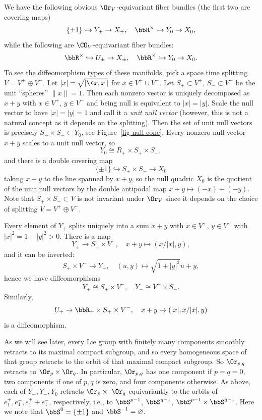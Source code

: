 We have the following obvious $\Or_V$-equivariant fiber bundles (the first two are covering maps)
\[\{\pm 1\}\hookrightarrow Y_\pm\to X_\pm,\quad \bbR^\times\hookrightarrow Y_0\to X_0,\]
while the following are $\CO_V$-equivariant fiber bundles:
\[\bbR^\times\hookrightarrow U_\pm\to X_\pm,\quad \bbR^\times\hookrightarrow Y_0\to X_0.\]
To see the diffeomorphism types of these manifolds, pick a space time splitting $V=V^+\oplus V^-$. Let $|x|=\sqrt{|\<x,x\>|}$ for $x\in V^+\cup V^-$. Let $S_+\subset V^+$, $S_-\subset V^-$ be the unit ``spheres'' $\lVert x\rVert =1$. Then each nonzero vector is uniquely decomposed as $x+y$ with $x\in V^+$, $y\in V^-$ and being null is equivalent to $|x|=|y|$. Scale the null vector to have $|x|=|y|=1$ and call it a \emph{unit null vector} (however, this is not a natural concept as it depends on the splitting). Then the set of unit null vectors is precisely $S_+\times S_-\subset Y_0$, see Figure~\ref{fig null cone}. Every nonzero null vector $x+y$ scales to a unit null vector, so 
\[Y_0\cong R_+\times S_+\times S_-,\]
and there is a double covering map 
\[\{\pm 1\}\hookrightarrow S_+\times S_-\to X_0\]
taking $x+y$ to the line spanned by $x+y$, so the null quadric $X_0$ is the quotient of the unit null vectors by the double antipodal map $x+y\mapsto (-x)+(-y)$. Note that $S_+\times S_-\subset V$ is not invariant under $\Or_V$ since it depends on the choice of splitting $V=V^+\oplus V^-$.

Every element of $Y_+$ splits uniquely into a sum $x+y$ with $x\in V^+$, $y\in V^-$ with $|x|^2=1+|y|^2>0$. There is a map 
\[Y_+\to S_+\times V^-,\quad x+y\mapsto (x/|x|,y),\]
and it can be inverted:
\[S_+\times V^-\to Y_+,\quad  (u,y)\mapsto \sqrt{1+|y|^2}u+y,\]
hence we have diffeomorphisms
\[Y_+\cong S_+\times V^-,\quad Y_-\cong V^+\times S_-.\]
Similarly, 
\[U_+\to \bbR_+\times S_+\times V^-,\quad x+y\mapsto (|x|,x/|x|,y)\]
is a diffeomorphism. 

As we will see later, every Lie group with finitely many components smoothly retracts to its maximal compact subgroup, and so every homogeneous space of that group retracts to the orbit of that maximal compact subgroup. So $\Or_{p,q}$ retracts to $\Or_p\times\Or_q$. In particular, $\Or_{p,q}$ has one component if $p=q=0$, two components if one of $p,q$ is zero, and four components otherwise.  As above, each of $Y_+,Y_-,Y_0$ retracts  $\Or_p\times\ \Or_q$-equivariantly to the orbits of $e_1^+,e_1^-,e_1^++e_1^-$, respectively, i.e., to $\bbS^{p-1}$, $\bbS^{q-1}$, $\bbS^{p-1}\times\bbS^{q-1}$. Here we note that $\bbS^{0}=\{\pm 1\}$ and $\bbS^{-1}=\varnothing$.

